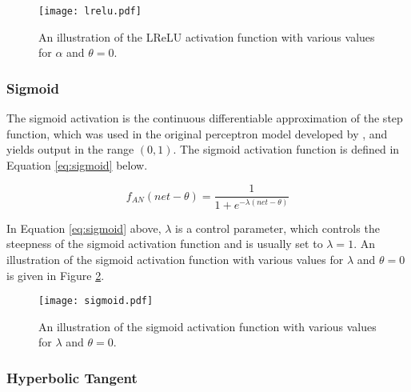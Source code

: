 \begin{figure}[htpb]
    \centering
    \texttt{[image: lrelu.pdf]}
    \caption[The \ac{LReLU} activation function]{An illustration of the \acs{LReLU} activation function with various values for $\alpha$ and $\theta = 0$.}
    \label{fig:anns:activation_functions:leaky_relu}
\end{figure}

\subsubsection{Sigmoid}\label{sec:anns:an:act_functions:sigmoid}

The sigmoid activation is the continuous differentiable approximation of the step function, which was used in the original perceptron model developed by \citeauthor{ref:rosenblatt:1957} \cite{ref:rosenblatt:1957}, and yields output in the range $(0, 1)$. The sigmoid activation function is defined in Equation \eqref{eq:sigmoid} below.

\begin{equation}
    f_{AN}(net - \theta) = \frac{1}{1+e^{-\lambda(net - \theta)}}
    \label{eq:sigmoid}
\end{equation}

\noindent
In Equation \eqref{eq:sigmoid} above, $\lambda$ is a control parameter, which controls the steepness of the sigmoid activation function and is usually set to $\lambda = 1$. An illustration of the sigmoid activation function with various values for $\lambda$ and $\theta = 0$ is given in Figure \ref{fig:anns:activation_functions:sigmoid}.

\begin{figure}[htpb]
    \centering
    \texttt{[image: sigmoid.pdf]}
    \caption[The sigmoid activation function]{An illustration of the sigmoid activation function with various values for $\lambda$ and $\theta = 0$.}
    \label{fig:anns:activation_functions:sigmoid}
\end{figure}

\subsubsection{Hyperbolic Tangent}\label{sec:anns:an:act_functions:tanh}

